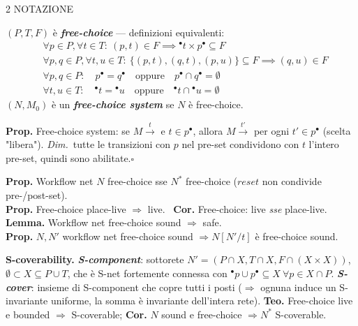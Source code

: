 \documentclass[8pt,a4paper]{extarticle}
\newcommand{\NOT}{\colorbox{black!12}{\scriptsize\textsf{NOTAZIONE}}}
\newcommand{\topic}[2]{%
  \Needspace*{5\baselineskip}%
  \vspace{4pt}\noindent{\color{tit}\bfseries #1}\hfill #2\par
  \vspace{0pt}{\color{tit}\rule{\linewidth}{0.7pt}}\par\vspace{1.5pt}}
\newcommand{\D}[1]{\textbf{\textit{#1}}}
\newcommand{\pre}[1]{{}^{\bullet}#1}
\newcommand{\post}[1]{#1^{\bullet}}
\newcommand{\pf}{{\color{pf}\itshape Dim.}~}
\newcommand{\sq}{\hfill\ensuremath{\square}}
\begin{document}
\begin{multicols*}{2}
\topic{9. Free-choice nets}{\NOT}
$(P,T,F)$ è \D{free-choice} --- definizioni equivalenti:
\begin{align*}
&\forall p\in P,\forall t\in T:\ (p,t)\in F \implies \pre{t}\times\post{p}\subseteq F\\
&\forall p,q\in P,\forall t,u\in T:\ \{(p,t),(q,t),(p,u)\}\subseteq F \implies (q,u)\in F\\
&\forall p,q\in P:\quad \post{p}=\post{q}\quad\text{oppure}\quad \post{p}\cap\post{q}=\emptyset\\
&\forall t,u\in T:\quad \pre{t}=\pre{u}\quad\text{oppure}\quad \pre{t}\cap\pre{u}=\emptyset
\end{align*}
$(N,M_0)$ è un \D{free-choice system} se $N$ è free-choice.

\textbf{Prop.} Free-choice system: se $M\xrightarrow{t}$ e $t\in\post{p}$, allora $M\xrightarrow{t'}$ per ogni $t'\in\post{p}$ (scelta "libera").
\pf tutte le transizioni con $p$ nel pre-set condividono con $t$ l'intero pre-set, quindi sono abilitate.\sq

\textbf{Prop.} Workflow net $N$ free-choice sse $N^*$ free-choice ($reset$ non condivide pre-/post-set).\\
\textbf{Prop.} Free-choice place-live $\Rightarrow$ live. \ \textbf{Cor.} Free-choice: live \emph{sse} place-live.\\
\textbf{Lemma.} Workflow net free-choice sound $\Rightarrow$ safe.\\
\textbf{Prop.} $N,N'$ workflow net free-choice sound $\Rightarrow N[N'/t]$ è free-choice sound.

\textbf{S-coverability.} \D{S-component}: sottorete $N'=(P\cap X,T\cap X,F\cap(X\times X))$, $\emptyset\subset X\subseteq P\cup T$, che è S-net fortemente connessa con $\pre{p}\cup\post{p}\subseteq X\ \forall p\in X\cap P$. \D{S-cover}: insieme di S-component che copre tutti i posti ($\Rightarrow$ ognuna induce un S-invariante uniforme, la somma è invariante dell'intera rete). \textbf{Teo.} Free-choice live e bounded $\Rightarrow$ S-coverable; \textbf{Cor.} $N$ sound e free-choice $\Rightarrow N^*$ S-coverable.


\end{multicols*}
\end{document}
